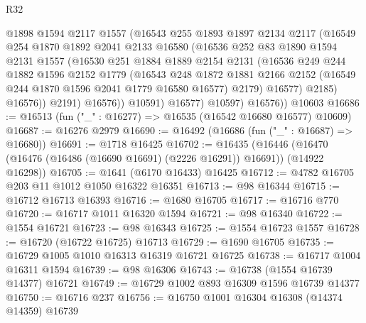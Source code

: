 \begin{lexlean}{R32}
\begin{coremodule}
                  @1898
                  @1594
                  @2117
                  @1557
                  (@16543
                    @255
                    @1893
                    @1897
                    @2134
                    @2117
                    (@16549
                      @254
                      @1870
                      @1892
                      @2041
                      @2133
                      @16580
                      (@16536
                        @252
                        @83
                        @1890
                        @1594
                        @2131
                        @1557
                        (@16530
                          @251
                          @1884
                          @1889
                          @2154
                          @2131
                          (@16536
                            @249
                            @244
                            @1882
                            @1596
                            @2152
                            @1779
                            (@16543
                              @248
                              @1872
                              @1881
                              @2166
                              @2152
                              (@16549 @244 @1870 @1596 @2041 @1779 @16580 @16577)
                              @2179)
                            @16577)
                          @2185)
                        @16576))
                    @2191)
                  @16576))
              @10591)
            @16577)
          @10597)
        @16576))
    @10603
@16686 := @16513 (fun ("_" : @16277) => @16535 (@16542 @16680 @16577) @10609)
@16687 := @16276 @2979
@16690 := @16492 (@16686 (fun ("_" : @16687) => @16680))
@16691 := @1718 @16425
@16702 := @16435
    (@16446 (@16470 (@16476 (@16486 (@16690 @16691) (@2226 @16291)) @16691)) (@14922 @16298))
@16705 := @1641 (@6170 @16433) @16425
@16712 := @4782 @16705 @203 @11 @1012 @1050 @16322 @16351
@16713 := @98 @16344
@16715 := @16712 @16713 @16393
@16716 := @1680 @16705
@16717 := @16716 @770
@16720 := @16717 @1011 @16320 @1594
@16721 := @98 @16340
@16722 := @1554 @16721
@16723 := @98 @16343
@16725 := @1554 @16723 @1557
@16728 := @16720 (@16722 @16725) @16713
@16729 := @1690 @16705
@16735 := @16729 @1005 @1010 @16313 @16319 @16721 @16725
@16738 := @16717 @1004 @16311 @1594
@16739 := @98 @16306
@16743 := @16738 (@1554 @16739 @14377) @16721
@16749 := @16729 @1002 @893 @16309 @1596 @16739 @14377
@16750 := @16716 @237
@16756 := @16750 @1001 @16304 @16308 (@14374 @14359) @16739

\end{coremodule}
\end{lexlean}
